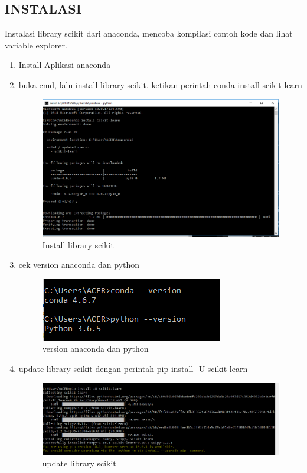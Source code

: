 \subsection{INSTALASI}
Instalasi library scikit dari anaconda, mencoba kompilasi contoh kode dan lihat variable explorer.
\begin {enumerate}
\par
\item Install Aplikasi anaconda
\item buka cmd, lalu install library scikit. ketikan perintah conda install scikit-learn 
\par
\begin{figure}[ht]
\centering
\includegraphics[scale=0.5]{figures/111.png}
\caption{Install library scikit}
\label{contoh1}
\end{figure}
\par

\item cek version anaconda dan python
\par
\begin{figure}[ht]
\centering
\includegraphics[scale=0.7]{figures/222.png}
\caption{version anaconda dan python}
\label{contoh2}
\end{figure}
\par

\item update library scikit dengan perintah pip install -U scikit-learn
\par
\begin{figure}[ht]
\centering
\includegraphics[scale=0.5]{figures/333.png}
\caption{update library scikit}
\label{contoh3}
\end{figure}
\par


\end{enumerate}
